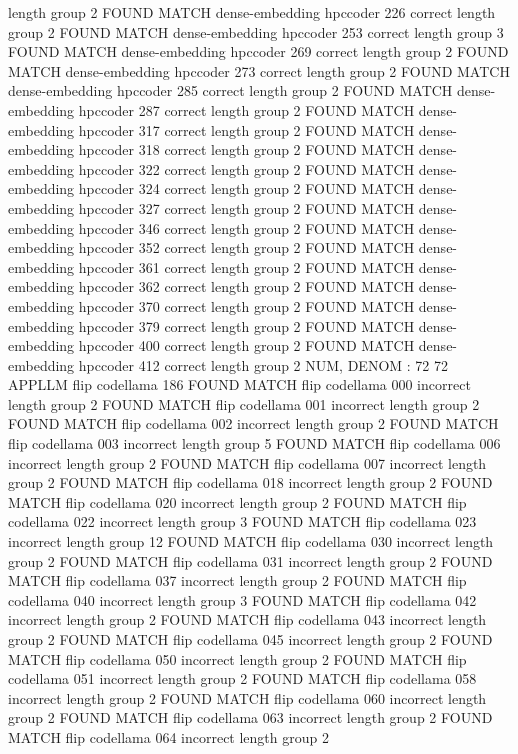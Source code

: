 length group  2
FOUND MATCH dense-embedding hpccoder 226 correct
length group  2
FOUND MATCH dense-embedding hpccoder 253 correct
length group  3
FOUND MATCH dense-embedding hpccoder 269 correct
length group  2
FOUND MATCH dense-embedding hpccoder 273 correct
length group  2
FOUND MATCH dense-embedding hpccoder 285 correct
length group  2
FOUND MATCH dense-embedding hpccoder 287 correct
length group  2
FOUND MATCH dense-embedding hpccoder 317 correct
length group  2
FOUND MATCH dense-embedding hpccoder 318 correct
length group  2
FOUND MATCH dense-embedding hpccoder 322 correct
length group  2
FOUND MATCH dense-embedding hpccoder 324 correct
length group  2
FOUND MATCH dense-embedding hpccoder 327 correct
length group  2
FOUND MATCH dense-embedding hpccoder 346 correct
length group  2
FOUND MATCH dense-embedding hpccoder 352 correct
length group  2
FOUND MATCH dense-embedding hpccoder 361 correct
length group  2
FOUND MATCH dense-embedding hpccoder 362 correct
length group  2
FOUND MATCH dense-embedding hpccoder 370 correct
length group  2
FOUND MATCH dense-embedding hpccoder 379 correct
length group  2
FOUND MATCH dense-embedding hpccoder 400 correct
length group  2
FOUND MATCH dense-embedding hpccoder 412 correct
length group  2
NUM, DENOM : 72 72
APPLLM flip codellama
186
FOUND MATCH flip codellama 000 incorrect
length group  2
FOUND MATCH flip codellama 001 incorrect
length group  2
FOUND MATCH flip codellama 002 incorrect
length group  2
FOUND MATCH flip codellama 003 incorrect
length group  5
FOUND MATCH flip codellama 006 incorrect
length group  2
FOUND MATCH flip codellama 007 incorrect
length group  2
FOUND MATCH flip codellama 018 incorrect
length group  2
FOUND MATCH flip codellama 020 incorrect
length group  2
FOUND MATCH flip codellama 022 incorrect
length group  3
FOUND MATCH flip codellama 023 incorrect
length group  12
FOUND MATCH flip codellama 030 incorrect
length group  2
FOUND MATCH flip codellama 031 incorrect
length group  2
FOUND MATCH flip codellama 037 incorrect
length group  2
FOUND MATCH flip codellama 040 incorrect
length group  3
FOUND MATCH flip codellama 042 incorrect
length group  2
FOUND MATCH flip codellama 043 incorrect
length group  2
FOUND MATCH flip codellama 045 incorrect
length group  2
FOUND MATCH flip codellama 050 incorrect
length group  2
FOUND MATCH flip codellama 051 incorrect
length group  2
FOUND MATCH flip codellama 058 incorrect
length group  2
FOUND MATCH flip codellama 060 incorrect
length group  2
FOUND MATCH flip codellama 063 incorrect
length group  2
FOUND MATCH flip codellama 064 incorrect
length group  2
